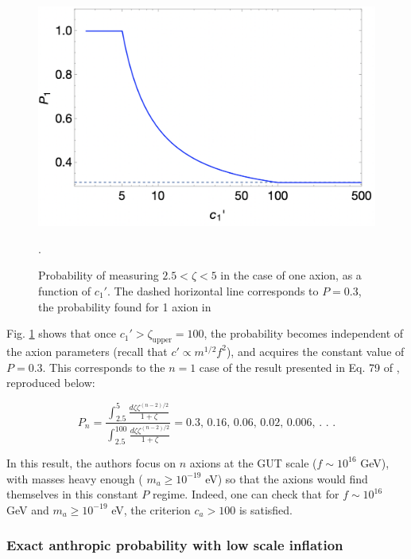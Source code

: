 \documentclass[11pt]{article}
\begin{document}
\begin{figure}[h]
    \includegraphics[scale=0.5]{figs/1axion-prob.jpeg}
    \centering
    \caption{Probability of measuring $2.5<\zeta<5$ in the case of one axion, as a function of $c_1'$. The dashed horizontal line corresponds to $P=0.3$, the probability found for 1 axion in \cite{exploring-string-axiverse}}.
    \label{fig:1axion-prob}
\end{figure}

Fig. \ref{fig:1axion-prob} shows that once $c_1'>\zeta_\text{upper}=100$, the probability becomes independent of the axion parameters (recall that $c' \propto m^{1/2}f^2$), and acquires the constant value of $P=0.3$. This corresponds to the $n=1$ case of the result presented in Eq. 79 of \cite{exploring-string-axiverse}, reproduced below:

\begin{equation}
\label{eq:bookkeeping-result}
    P_n = \frac{\int_{2.5}^5 \frac{d\zeta \zeta^{(n-2)/2}}{1+\zeta}}{\int_{2.5}^{100}\frac{d\zeta \zeta^{(n-2)/2}}{1+\zeta}} = \text{0.3, 0.16, 0.06, 0.02, 0.006, . . .}
\end{equation}

\noindent In this result, the authors focus on $n$ axions at the GUT scale ($f\sim 10^{16}$ GeV), with masses heavy enough ( $m_a\geq10^{-19}$ eV) so that the axions would find themselves in this constant $P$ regime. Indeed, one can check that for $f\sim 10^{16}$ GeV and $m_a\geq10^{-19}$ eV, the criterion $c_a>100$ is satisfied.

\subsubsection{Exact anthropic probability with low scale inflation}
\end{document}
